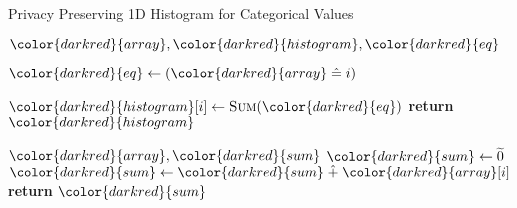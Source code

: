 \begin{algorithm}[H]
\caption{Privacy Preserving 1D Histogram for Categorical Values}\label{a:1d-histogram-categorical}
\begin{algorithmic}[1]
\renewcommand{\algorithmicrequire}{\textbf{Private Vars:}}
\Require ${\color{darkred}{array}}, {\color{darkred}{histogram}}, {\color{darkred}{eq}}$

        \State ${\color{darkred}{eq}} \gets ({\color{darkred}{array}} \heq i)$

        \State ${\color{darkred}{histogram}}[i] \gets
        \textsc{Sum}({\color{darkred}{eq}})$
    \EndFor
    \State \textbf{return} {${\color{darkred}{histogram}}$}
\EndProcedure

\begin{spacing}{0.5}
\end{spacing}

\Require ${\color{darkred}{array}}, {\color{darkred}{sum}}$
    \State ${\color{darkred}{sum}} \gets \enc{0}$
        \State ${\color{darkred}{sum}} \gets {\color{darkred}{sum}} \hplus{\color{darkred}{array}}[i]$
    \EndFor
    \State \textbf{return} {${\color{darkred}{sum}}$}
\EndProcedure

\end{algorithmic}
\end{algorithm}

